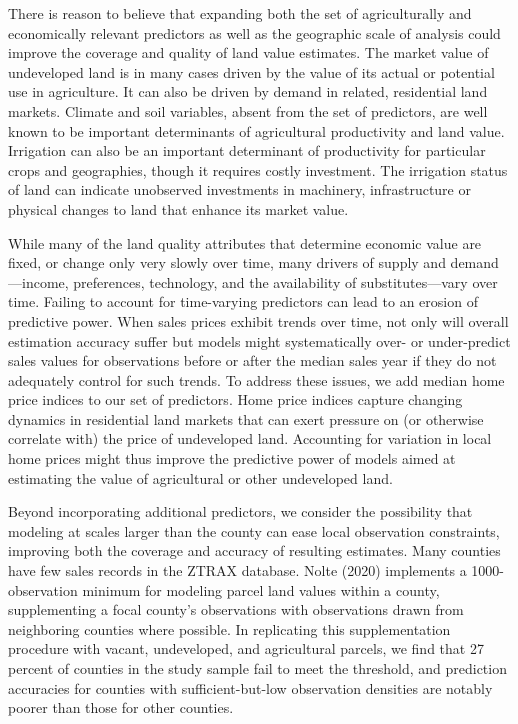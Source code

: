 \documentclass[12pt]{article}
\begin{document}
There is reason to believe that expanding both the set of agriculturally and economically relevant predictors as well as the geographic scale of analysis could improve the coverage and quality of land value estimates. The market value of undeveloped land is in many cases driven by the value of its actual or potential use in agriculture. It can also be driven by demand in related, residential land markets. Climate and soil variables, absent from the set of \textcite{Nolte2020High-resolutionStates} predictors, are well known to be important determinants of agricultural productivity and land value. Irrigation can also be an important determinant of productivity for particular crops and geographies, though it requires costly investment. The irrigation status of land can indicate unobserved investments in machinery, infrastructure or physical changes to land that enhance its market value. 

While many of the land quality attributes that determine economic value are fixed, or change only very slowly over time, many drivers of supply and demand—income, preferences, technology, and the availability of substitutes---vary over time. Failing to account for time-varying predictors can lead to an erosion of predictive power. When sales prices exhibit trends over time, not only will overall estimation accuracy suffer but models might systematically over- or under-predict sales values for observations before or after the median sales year if they do not adequately control for such trends. To address these issues, we add median home price indices to our set of predictors. Home price indices capture changing dynamics in residential land markets that can exert pressure on (or otherwise correlate with) the price of undeveloped land. Accounting for variation in local home prices might thus improve the predictive power of models aimed at estimating the value of agricultural or other undeveloped land. 

Beyond incorporating additional predictors, we consider the possibility that modeling at scales larger than the county can ease local observation constraints, improving both the coverage and accuracy of resulting estimates. Many counties have few sales records in the ZTRAX database. Nolte (2020) implements a 1000-observation minimum for modeling parcel land values within a county, supplementing a focal county’s observations with observations drawn from neighboring counties where possible. In replicating this supplementation procedure with vacant, undeveloped, and agricultural parcels, we find that 27 percent of counties in the study sample fail to meet the threshold, and prediction accuracies for counties with sufficient-but-low observation densities are notably poorer than those for other counties. 
\end{document}
